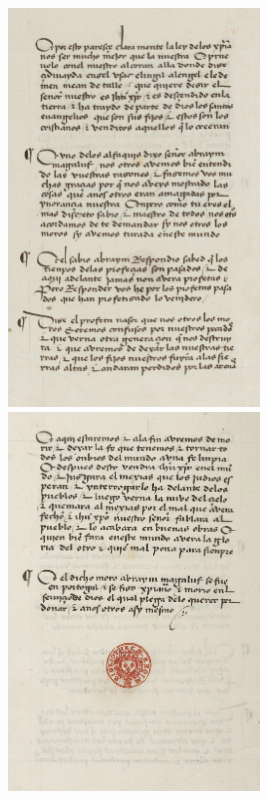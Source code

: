 \includegraphics[width=0.5\textwidth]{HistoireIslamMediterranee/Images/DisputaFez9.png}
\includegraphics[width=0.5\textwidth]{HistoireIslamMediterranee/Images/DisputaFez10.png}
 
